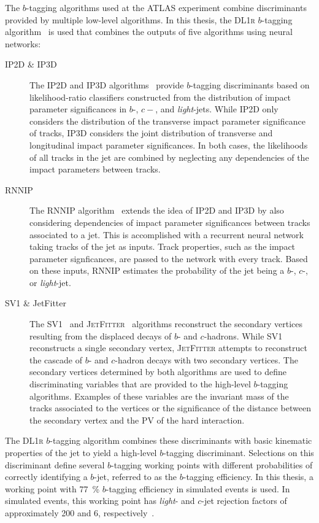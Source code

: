 The $b$-tagging algorithms used at the ATLAS experiment combine discriminants
provided by multiple low-level algorithms. In this thesis, the \textsc{DL1r}
$b$-tagging algorithm~\cite{FTAG-2019-07-001} is used that combines the outputs
of five algorithms using neural networks:
\begin{description}

\item[IP2D \& IP3D] The \textsc{IP2D} and \textsc{IP3D}
  algorithms~\cite{ATL-PHYS-PUB-2017-013} provide $b$-tagging discriminants
  based on likelihood-ratio classifiers constructed from the distribution of
  impact parameter significances in $b$-, $c-$, and \emph{light}-jets. While
  \textsc{IP2D} only considers the distribution of the transverse impact
  parameter significance of tracks, \textsc{IP3D} considers the joint
  distribution of transverse and longitudinal impact parameter significances.
  In both cases, the likelihoods of all tracks in the jet are combined by
  neglecting any dependencies of the impact parameters between tracks.

\item[RNNIP] The \textsc{RNNIP} algorithm~\cite{ATL-PHYS-PUB-2017-003} extends
  the idea of \textsc{IP2D} and \textsc{IP3D} by also considering dependencies
  of impact parameter significances between tracks associated to a jet. This is
  accomplished with a recurrent neural network taking tracks of the jet as
  inputs. Track properties, such as the impact parameter signficances, are
  passed to the network with every track. Based on these inputs, \textsc{RNNIP}
  estimates the probability of the jet being a $b$-, $c$-, or \emph{light}-jet.

\item[SV1 \& JetFitter] The \textsc{SV1}~\cite{ATL-PHYS-PUB-2017-011} and
  \textsc{JetFitter}~\cite{ATL-PHYS-PUB-2018-025} algorithms reconstruct the
  secondary vertices resulting from the displaced decays of $b$- and
  $c$-hadrons. While \textsc{SV1} reconstructs a single secondary vertex,
  \textsc{JetFitter} attempts to reconstruct the cascade of $b$- and $c$-hadron
  decays with two secondary vertices. The secondary vertices determined by both
  algorithms are used to define discriminating variables that are provided to
  the high-level $b$-tagging algorithms. Examples of these variables are the
  invariant mass of the tracks associated to the vertices or the significance of
  the distance between the secondary vertex and the PV of the hard interaction.

\end{description}
The \textsc{DL1r} $b$-tagging algorithm combines these discriminants with basic
kinematic properties of the jet to yield a high-level $b$-tagging discriminant.
Selections on this discriminant define several $b$-tagging working points with
different probabilities of correctly identifying a $b$-jet, referred to as the
$b$-tagging efficiency. In this thesis, a working point with \SI{77}{\percent}
$b$-tagging efficiency in simulated \ttbar events is used.  In simulated \ttbar
events, this working point has \emph{light}- and $c$-jet rejection factors of
approximately 200 and 6, respectively~\cite{FTAG-2019-07-001}.


